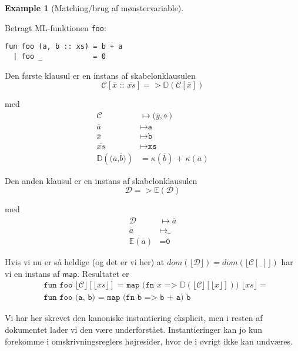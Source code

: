 \documentclass[oneside]{memoir}
\theoremstyle{definition}
\newtheorem{example}{Example}
\begin{document}
\begin{example}[Matching/brug af mønstervariable] \

  
  Betragt ML-funktionen \texttt{foo}:

\begin{verbatim}
fun foo (a, b :: xs) = b + a
  | foo _            = 0
\end{verbatim}

  Den første klausul er en instans af skabelonklausulen
  \[
  \mathcal{C}[\overline{x}\texttt{ :: }\overline{xs}] =>
  \mathbb{D}(\mathcal{C}[\overline{x}])
  \]

  med
  \begin{align}
    \mathcal{C} &\mapsto \texttt{(}\overline{y}\texttt{,} \diamond\texttt{)}\\
    \overline{a} &\mapsto \texttt{a}\\
    \overline{x} &\mapsto \texttt{b}\\
    \overline{xs} &\mapsto \texttt{xs}\\
    \mathbb{D}(\texttt{(}\overline{a}\texttt{,} \overline{b}\texttt{)}) &=
    \kappa(\overline{b}) \texttt{ + } \kappa(\overline{a})
  \end{align}

  Den anden klausul er en instans af skabelonklausulen
  \[
  \mathcal{D} => \mathbb{E}(\mathcal{D})
  \]

  med
  \begin{align}
    \mathcal{D} &\mapsto \overline{a}\\
    \overline{a} &\mapsto \texttt{\_}\\
    \mathbb{E}(\overline{a}) &= \texttt{0}
  \end{align}

  Hvis vi nu er så heldige (og det er vi her) at $dom(\lfloor\mathcal{D}\rfloor)
  = dom(\lfloor\mathcal{C[\texttt{\_}]}\rfloor)$ har vi en instans af
  $\textsf{map}$. Resultatet er
  \begin{align}
    &\texttt{fun foo $\lfloor \mathcal{C} \rfloor [\lfloor xs \rfloor]$ = map (fn $x$ =>
      $\mathbb{D}(\lfloor \mathcal{C} \rfloor[\lfloor x \rfloor])$) $\lfloor xs
      \rfloor$} =\\
    &\texttt{fun foo (a, b) = map (fn b => b + a) b}
  \end{align}

  Vi har her skrevet den kanoniske instantiering eksplicit, men i resten af
  dokumentet lader vi den være underforstået. Instantieringer kan jo kun
  forekomme i omskrivningsreglers højresider, hvor de i øvrigt ikke kan
  undværes.
\end{example}
\end{document}
